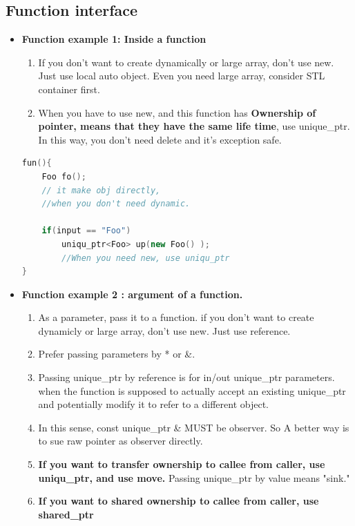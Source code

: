 \documentclass[a4paper,11pt,twoside]{book}
\begin{document}
\subsection{Function interface}

\begin{itemize}

\item \textbf{Function example 1: Inside a function}
\begin{enumerate}
\item If you don't want to create dynamically or large array, don't use new. Just use local auto object. Even you need large array, consider STL container first.
\item When you have to use new, and this function has \textbf{Ownership of pointer, means that they have the same life time},  use unique\_ptr. In this way, you don't need delete and it's exception safe.
\end{enumerate}
\begin{lstlisting}[frame=single, language=c++]
fun(){
	Foo fo();
	// it make obj directly,
	//when you don't need dynamic.

	if(input == "Foo")
		uniqu_ptr<Foo> up(new Foo() );
		//When you need new, use uniqu_ptr
}
\end{lstlisting}


\item \textbf{Function example 2 : argument of a function.}
\begin{enumerate}
\item As a parameter, pass it to a function. if you don't want to create dynamicly or large array, don't use new. Just use reference.

\item Prefer passing parameters by * or \&.

\item Passing unique\_ptr by reference is for in/out unique\_ptr parameters. when the function is supposed to actually accept an existing unique\_ptr and potentially modify it to refer to a different object. 

\item In this sense, const unique\_ptr \& MUST be observer. So A better way is to sue raw pointer as observer directly.

\item \textbf{If you want to transfer ownership to callee from caller, use uniqu\_ptr, and use move.} Passing unique\_ptr by value means "sink."

\item \textbf{If you want to shared ownership to callee from caller, use shared\_ptr}


\end{enumerate}
\end{itemize}
\end{document}
